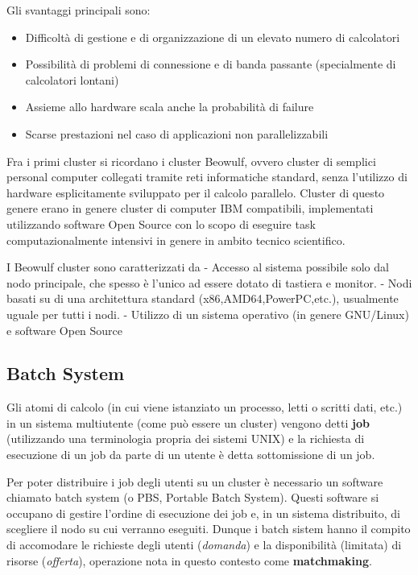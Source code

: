 \documentclass[italian,]{article}
\providecommand{\tightlist}{%
  \setlength{\itemsep}{0pt}\setlength{\parskip}{0pt}}
\begin{document}
Gli svantaggi principali sono:

\begin{itemize}
\tightlist
\item
  Difficoltà di gestione e di organizzazione di un elevato numero di
  calcolatori
\item
  Possibilità di problemi di connessione e di banda passante
  (specialmente di calcolatori lontani)
\item
  Assieme allo hardware scala anche la probabilità di failure
\item
  Scarse prestazioni nel caso di applicazioni non parallelizzabili
\end{itemize}

Fra i primi cluster si ricordano i cluster Beowulf, ovvero cluster di
semplici personal computer collegati tramite reti informatiche standard,
senza l'utilizzo di hardware esplicitamente sviluppato per il calcolo
parallelo. Cluster di questo genere erano in genere cluster di computer
IBM compatibili, implementati utilizzando software Open Source con lo
scopo di eseguire task computazionalmente intensivi in genere in ambito
tecnico scientifico.

I Beowulf cluster sono caratterizzati da - Accesso al sistema possibile
solo dal nodo principale, che spesso è l'unico ad essere dotato di
tastiera e monitor. - Nodi basati su di una architettura standard
(x86,AMD64,PowerPC,etc.), usualmente uguale per tutti i nodi. - Utilizzo
di un sistema operativo (in genere GNU/Linux) e software Open Source

\subsection{Batch System}\label{batch-system}

Gli atomi di calcolo (in cui viene istanziato un processo, letti o
scritti dati, etc.) in un sistema multiutente (come può essere un
cluster) vengono detti \textbf{job} (utilizzando una terminologia
propria dei sistemi UNIX) e la richiesta di esecuzione di un job da
parte di un utente è detta sottomissione di un job.

Per poter distribuire i job degli utenti su un cluster è necessario un
software chiamato batch system (o PBS, Portable Batch System). Questi
software si occupano di gestire l'ordine di esecuzione dei job e, in un
sistema distribuito, di scegliere il nodo su cui verranno eseguiti.
Dunque i batch sistem hanno il compito di accomodare le richieste degli
utenti (\emph{domanda}) e la disponibilità (limitata) di risorse
(\emph{offerta}), operazione nota in questo contesto come
\textbf{matchmaking}.
\end{document}
